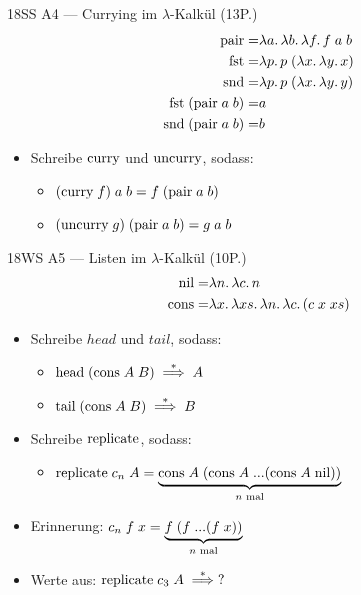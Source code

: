 \documentclass{beamer}
\begin{document}
\begin{frame}{18SS A4 --- Currying im $\lambda$-Kalkül (13P.)}
	\begin{eqnarray*}
		\text{pair} =& \lambda a.\, \lambda b.\, \lambda f.\, f\;a\;b \\
                \text{fst}  =& \lambda p.\, p\;(\lambda x.\, \lambda y.\, x) \\
                \text{snd}  =& \lambda p.\, p\;(\lambda x.\, \lambda y.\, y) \\
                \text{fst}\;(\text{pair}\;a\;b) =& a \\
                \text{snd}\;(\text{pair}\;a\;b) =& b \\
	\end{eqnarray*}

	\begin{itemize}
		\item Schreibe $\text{curry}$ und $\text{uncurry}$, sodass:
		\begin{itemize}
                  \item $\appp{(\app{\ccurry}{f})}{a}{b} = \appp{f}{(\appp{\cpair}{a}{b})}$
                  \item $(\text{uncurry}\;g)\;(\text{pair}\;a\;b) = g\;a\;b$
		\end{itemize}
	\end{itemize}
\end{frame}

\begin{frame}{18WS A5 --- Listen im $\lambda$-Kalkül (10P.)}
	\begin{eqnarray*}
		\text{nil}  =& \lambda n.\, \lambda c.\, n \\
                \text{cons} =& \lambda x.\, \lambda xs.\, \lambda n.\, \lambda c.\, (c\;x\;xs)
	\end{eqnarray*}

	\begin{itemize}
		\item Schreibe $head$ und $tail$, sodass:
		\begin{itemize}
                  \item $\text{head}\;(\text{cons}\;A\;B) \stackrel{*}{\implies} A$
                  \item $\text{tail}\;(\text{cons}\;A\;B) \stackrel{*}{\implies} B$
		\end{itemize}
		\pause
		\item Schreibe $\text{replicate}$, sodass:
		\begin{itemize}
                  \item $\text{replicate}\;c_{n}\;A = \underbrace{\text{cons}\;A\;(\text{cons}\;A\;... (\text{cons}\;A\;\text{nil}))}_\text{$n$ mal}$
		\end{itemize}
              \item Erinnerung: $c_{n}\;f\;x = \underbrace{f\;(f\;... (f\;x))}_\text{$n$ mal}$
		\pause
              \item Werte aus: $\text{replicate}\;c_{3}\;A \stackrel{*}{\implies} ?$
	\end{itemize}
\end{frame}
\end{document}
